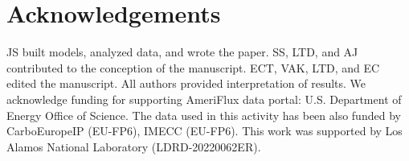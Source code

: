 \documentclass{article}
\begin{document}
\section{Acknowledgements}

JS built models, analyzed data, and wrote the paper. SS, LTD, and AJ contributed to the conception of the manuscript. ECT, VAK, LTD, and EC edited the manuscript. All authors provided interpretation of results. We acknowledge funding for supporting AmeriFlux data portal: U.S. Department of Energy Office of Science. The data used in this activity has been also funded by CarboEuropeIP (EU-FP6), IMECC (EU-FP6). This work was supported by Los Alamos National Laboratory (LDRD-20220062ER).



\end{document}

